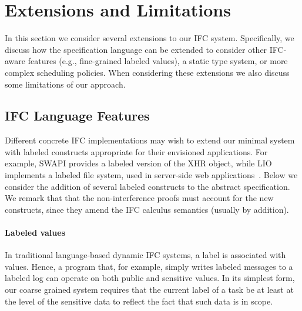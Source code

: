 \section{Extensions and Limitations}
\label{sec:extensions}

In this section we consider several extensions to our IFC system.
%
Specifically, we discuss how the specification language can be
extended to consider other IFC-aware features (e.g., fine-grained
labeled values), a static type system, or more complex scheduling
policies.
%
When considering these extensions we also discuss some limitations
of our approach.

\subsection{IFC Language Features}
\label{sec:extensions:labeled}

Different concrete IFC implementations may wish to extend our minimal
system with labeled constructs appropriate for their envisioned
applications.
%
For example, SWAPI provides a labeled version of the XHR object, while
LIO implements a labeled file system, used in server-side web
applications~\cite{hails}.
%
Below we
consider the addition of several labeled constructs to the abstract specification.
%
We remark that that the non-interference proofs must account for the
new constructs, since they amend the IFC calculus semantics (usually
by addition).

\paragraph{Labeled values}
In traditional language-based dynamic IFC systems, a label is
associated with values.
%
Hence, a program that, for example, simply writes labeled messages to
a labeled log can operate on both public and sensitive values.
%
In its simplest form, our coarse grained system requires that the
current label of a task be at least at the level of the sensitive data
to reflect the fact that such data is in scope.
 
